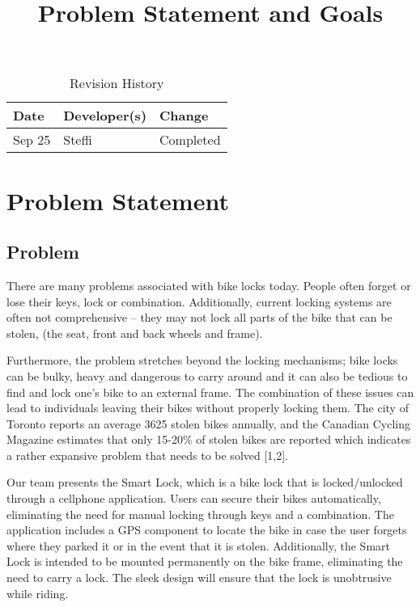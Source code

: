 \documentclass{article}
\title{Problem Statement and Goals\\\progname}
\author{\authname}
\date{}
\begin{document}
\maketitle

\begin{table}[hp]
\caption{Revision History} \label{TblRevisionHistory}
\begin{tabularx}{\textwidth}{llX}
\toprule
\textbf{Date} & \textbf{Developer(s)} & \textbf{Change}\\
\midrule
Sep 25 & Steffi & Completed\\
\bottomrule
\end{tabularx}
\end{table}

\section{Problem Statement}

\subsection{Problem}

There are many problems associated with bike locks today.  People often forget or lose their keys, lock or combination.  Additionally, current locking systems are often not comprehensive – they may not lock all parts of the bike that can be stolen, (the seat, front and back wheels and frame). 

Furthermore, the problem stretches beyond the locking mechanisms; bike locks can be bulky, heavy and dangerous to carry around and it can also be tedious to find and lock one’s bike to an external frame.  The combination of these issues can lead to individuals leaving their bikes without properly locking them.  The city of Toronto reports an average 3625 stolen bikes annually, and the Canadian Cycling Magazine estimates that only 15-20\% of stolen bikes are reported which indicates a rather expansive problem that needs to be solved [1,2]. 

Our team presents the Smart Lock, which is a bike lock that is locked/unlocked through a cellphone application.  Users can secure their bikes automatically, eliminating the need for manual locking through keys and a combination.  The application includes a GPS component to locate the bike in case the user forgets where they parked it or in the event that it is stolen.  Additionally, the Smart Lock is intended to be mounted permanently on the bike frame, eliminating the need to carry a lock.  The sleek design will ensure that the lock is unobtrusive while riding. 
\end{document}
